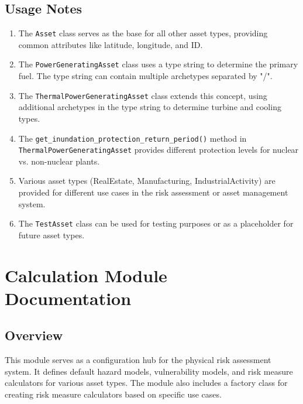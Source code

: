 \documentclass{article}
\begin{document}
\subsection{Usage Notes}

\begin{enumerate}
    \item The \texttt{Asset} class serves as the base for all other asset types, providing common attributes like latitude, longitude, and ID.
    
    \item The \texttt{PowerGeneratingAsset} class uses a type string to determine the primary fuel. The type string can contain multiple archetypes separated by "/".
    
    \item The \texttt{ThermalPowerGeneratingAsset} class extends this concept, using additional archetypes in the type string to determine turbine and cooling types.
    
    \item The \texttt{get\_inundation\_protection\_return\_period()} method in \texttt{ThermalPowerGeneratingAsset} provides different protection levels for nuclear vs. non-nuclear plants.
    
    \item Various asset types (RealEstate, Manufacturing, IndustrialActivity) are provided for different use cases in the risk assessment or asset management system.
    
    \item The \texttt{TestAsset} class can be used for testing purposes or as a placeholder for future asset types.
\end{enumerate}

\newpage
\section{Calculation Module Documentation}

\subsection{Overview}

This module serves as a configuration hub for the physical risk assessment system. It defines default hazard models, vulnerability models, and risk measure calculators for various asset types. The module also includes a factory class for creating risk measure calculators based on specific use cases.
\end{document}
